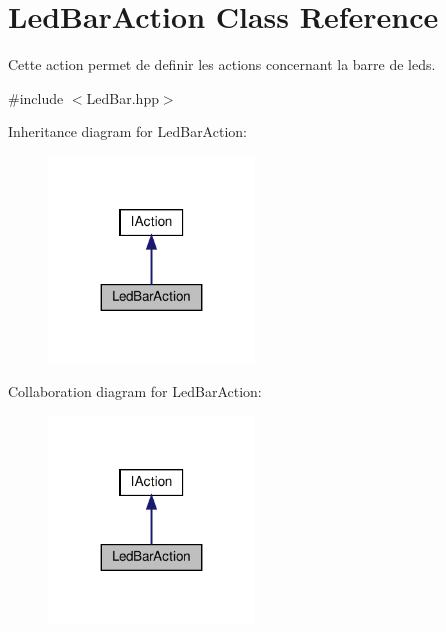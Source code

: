 \hypertarget{classLedBarAction}{}\section{Led\+Bar\+Action Class Reference}
\label{classLedBarAction}


Cette action permet de definir les actions concernant la barre de leds.  




{\ttfamily \#include $<$Led\+Bar.\+hpp$>$}



Inheritance diagram for Led\+Bar\+Action\+:
\nopagebreak
\begin{figure}[H]
\begin{center}
\leavevmode
\includegraphics[width=155pt]{classLedBarAction__inherit__graph}
\end{center}
\end{figure}


Collaboration diagram for Led\+Bar\+Action\+:
\nopagebreak
\begin{figure}[H]
\begin{center}
\leavevmode
\includegraphics[width=155pt]{classLedBarAction__coll__graph}
\end{center}
\end{figure}
